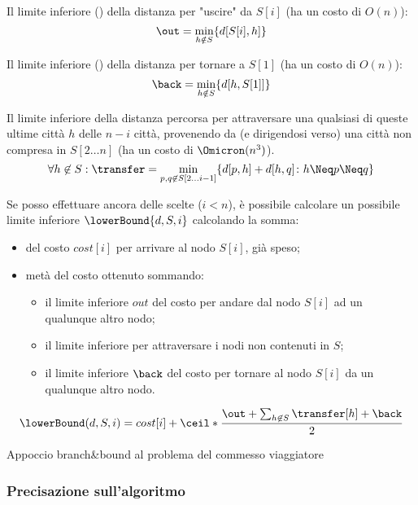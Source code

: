 \begin{minipage}[c]{.45\textwidth}
Il limite inferiore () della distanza per "uscire" da \(S[i]\) (ha un costo di \(O(n)\)):
\[
	\out  = \min_{h \notin S} \{ d[S[i], h] \}
\]
\end{minipage}\hfill
\begin{minipage}[c]{.45\textwidth}
Il limite inferiore () della distanza per tornare a \(S[1]\) (ha un costo di \(O(n)\)):
\[
	\back = \min_{h \notin S} \{ d[h, S[1]] \}
\]
\end{minipage}


Il limite inferiore della distanza percorsa per attraversare una qualsiasi di queste ultime città \(h\) delle \(n - i\) città, provenendo da (e dirigendosi verso) una città non compresa in \(S[2\dots n]\) (ha un costo di \(\Omicron(n^3)\)).
\[
	\forall h \not\in S: \transfer = \min_{p,q \not\in S[2\dots i-1]}\{d[p, h] + d[h, q] \colon h \Neq p \Neq q \}
\]

Se posso effettuare ancora delle scelte (\(i < n\)), è possibile calcolare un possibile limite inferiore \(\lowerBound{d, S, i}\) calcolando la somma:
\begin{itemize}
	\item del costo \(cost[i]\) per arrivare al nodo \(S[i]\), già speso;
	\item metà del costo ottenuto sommando:
	\begin{itemize}
		\item il limite inferiore \(out\) del costo per andare dal nodo \(S[i]\) ad un qualunque altro nodo;
		\item il limite inferiore per attraversare i nodi non contenuti in \(S\);
		\item il limite inferiore \(\back\) del costo per tornare al nodo \(S[i]\) da un qualunque altro nodo.
	\end{itemize}
\end{itemize}
\[
	\lowerBound(d,S,i) = cost[i] + \ceil*{\frac{\out + \sum_{h \not\in S} \transfer[h] + \back}{2}}
\]

\begin{algorithm}[H]
	\caption{Appoccio branch\&bound al problema del commesso viaggiatore}
	
\end{algorithm}

\subsubsection{Precisazione sull'algoritmo}

